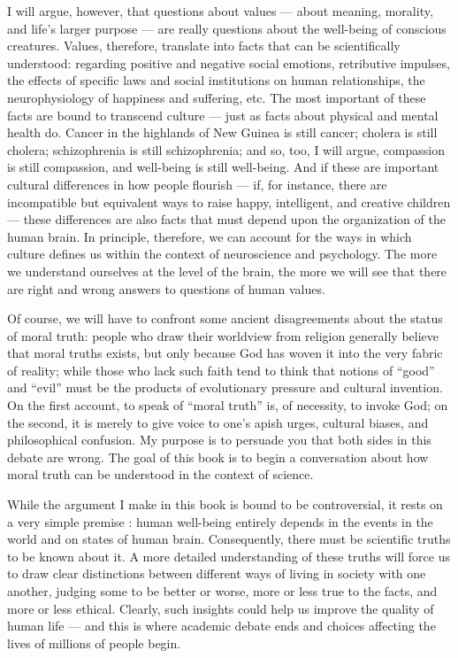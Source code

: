 \documentclass[a4paper,14pt]{extarticle}
\begin{document}
I will argue, however, that questions about values --- about meaning, morality, and life's larger purpose --- are really questions about the well-being of conscious creatures.
Values, therefore, translate into facts that can be scientifically understood: regarding positive and negative social emotions, retributive impulses, the effects of specific laws and social institutions on human relationships, the neurophysiology of happiness and suffering, etc.
The most important of these facts are bound to transcend culture --- just as facts about physical and mental health do.
Cancer in the highlands of New Guinea is still cancer;
cholera is still cholera;
schizophrenia is still schizophrenia;
and so, too, I will argue, compassion is still compassion, and well-being is still well-being.
And if these are important cultural differences in how people flourish --- if, for instance, there are incompatible but equivalent ways to raise happy, intelligent, and creative children --- these differences are also facts that must depend upon the organization of the human brain.
In principle, therefore, we can account for the ways in which culture defines us within the context of neuroscience and psychology.
The more we understand ourselves at the level of the brain, the more we will see that there are right and wrong answers to questions of human values.

Of course, we will have to confront some ancient disagreements about the status of moral truth:
people who draw their worldview from religion generally believe that moral truths exists, but only because God has woven it into the very fabric of reality;
while those who lack such faith tend to think that notions of ``good'' and ``evil'' must be the products of evolutionary pressure and cultural invention.
On the first account, to speak of ``moral truth'' is, of necessity, to invoke God;
on the second, it is merely to give voice to one's apish urges, cultural biases, and philosophical confusion.
My purpose is to persuade you that both sides in this debate are wrong.
The goal of this book is to begin a conversation about how moral truth can be understood in the context of science.

While the argument I make in this book is bound to be controversial, it rests on a very simple premise :
human well-being entirely depends in the events in the world and on states of human brain.
Consequently, there must be scientific truths to be known about it.
A more detailed understanding of these truths will force us to draw clear distinctions between different ways of living in society with one another, judging some to be better or worse, more or less true to the facts, and more or less ethical.
Clearly, such insights could help us improve the quality of human life --- and this is where academic debate ends and choices affecting the lives of millions of people begin.
\end{document}
